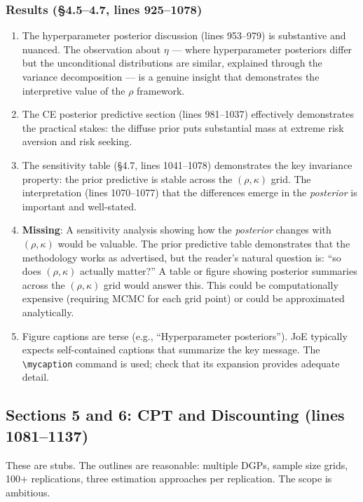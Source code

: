 \documentclass[12pt,a4paper]{article}
\begin{document}
\subsubsection{Results (\S4.5--4.7, lines 925--1078)}

\begin{enumerate}[label=(\alph*)]
  \item The hyperparameter posterior discussion (lines 953--979) is substantive
    and nuanced. The observation about $\eta$ --- where hyperparameter
    posteriors differ but the unconditional distributions are similar, explained
    through the variance decomposition --- is a genuine insight that
    demonstrates the interpretive value of the $\rho$ framework.
  \item The CE posterior predictive section (lines 981--1037) effectively
    demonstrates the practical stakes: the diffuse prior puts
    substantial mass at extreme risk aversion and risk seeking.
  \item The sensitivity table (\S4.7, lines 1041--1078) demonstrates the
    key invariance property: the prior predictive is stable across the
    $(\rho, \kappa)$ grid. The interpretation (lines 1070--1077) that the
    differences emerge in the \emph{posterior} is important and well-stated.
  \item \textbf{Missing}: A sensitivity analysis showing how the \emph{posterior}
    changes with $(\rho, \kappa)$ would be valuable. The prior predictive table
    demonstrates that the methodology works as advertised, but the reader's
    natural question is: ``so does $(\rho, \kappa)$ actually matter?'' A table
    or figure showing posterior summaries across the $(\rho, \kappa)$ grid
    would answer this. This could be computationally expensive (requiring
    MCMC for each grid point) or could be approximated analytically.
  \item Figure captions are terse (e.g., ``Hyperparameter posteriors''). JoE
    typically expects self-contained captions that summarize the key message.
    The \verb|\mycaption| command is used; check that its expansion provides
    adequate detail.
\end{enumerate}


\subsection{Sections 5 and 6: CPT and Discounting (lines 1081--1137)}

These are stubs. The outlines are reasonable: multiple DGPs, sample size grids,
100+ replications, three estimation approaches per replication. The scope is
ambitious.
\end{document}
